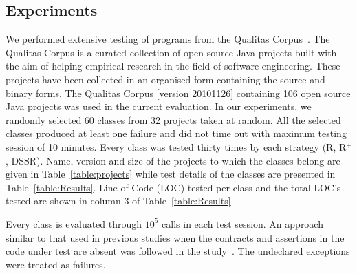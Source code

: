 \subsection{Experiments}
We performed extensive testing of programs from the Qualitas Corpus~\cite{tempero2010empirical}. The Qualitas Corpus is a curated collection of open source Java projects built with the aim of helping empirical research in the field of software engineering. These projects have been collected in an organised form containing the source and binary forms. The Qualitas Corpus [version 20101126] containing 106 open source Java projects was used in the current evaluation. In our experiments, we randomly selected 60 classes from 32 projects taken at random. All the selected classes produced at least one failure and did not time out with maximum testing session of 10 minutes. Every class was tested thirty times by each strategy (R, R$^+$, DSSR). Name, version and size of the projects to which the classes belong are given in Table~\ref{table:projects} while test details of the classes are presented in Table~\ref{table:Results}. Line of Code (LOC) tested per class and the total LOC's tested are shown in column 3 of Table~\ref{table:Results}. 

Every class is evaluated through $10^5$ calls in each test session. %
An approach similar to that used in previous studies when the contracts and assertions in the code under test are absent was followed in the study~\cite{oriol2012random}. The undeclared exceptions were treated as failures.


